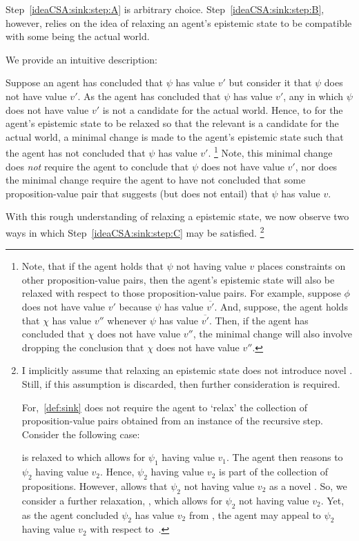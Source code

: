 \begin{note}
  Step~\ref{ideaCSA:sink:step:A} is arbitrary choice.
  Step~\ref{ideaCSA:sink:step:B}, however, relies on the idea of relaxing an agent's epistemic state to be compatible with some \epN{} \world{} being the actual world.

  We provide an intuitive description:

  Suppose an agent has concluded that \(\psi\) has value \(v'\) but consider it \ep{} that \(\psi\) does not have value \(v'\).
  As the agent has concluded that \(\psi\) has value \(v'\), any \ep{} in which \(\psi\) does not have value \(v'\) is not a candidate for the actual world.
  Hence, to for the agent's epistemic state to be relaxed so that the relevant \ep{} \world{} is a candidate for the actual world, a minimal change is made to the agent's epistemic state such that the agent has not concluded that \(\psi\) has value \(v'\).\nolinebreak
  \footnote{
    Note, that if the agent holds that \(\psi\) not having value \(v\) places constraints on other proposition-value pairs, then the agent's epistemic state will also be relaxed with respect to those proposition-value pairs.
    For example, suppose \(\phi\) does not have value \(v'\) because \(\psi\) has value \(\overline{v'}\).
    And, suppose, the agent holds that \(\chi\) has value \(v''\) whenever \(\psi\) has value \(\overline{v'}\).
    Then, if the agent has concluded that \(\chi\) does not have value \(v''\), the minimal change will also involve dropping the conclusion that \(\chi\) does not have value \(v''\).
  }
  Note, this minimal change does \emph{not} require the agent to conclude that \(\psi\) does not have value \(v'\), nor does the minimal change require the agent to have not concluded that some proposition-value pair that suggests (but does not entail) that \(\psi\) has value \(v\).

  With this rough understanding of relaxing a epistemic state, we now observe two ways in which Step~\ref{ideaCSA:sink:step:C} may be satisfied.\nolinebreak
  \footnote{
    I implicitly assume that relaxing an epistemic state does not introduce novel \epN{} .
    Still, if this assumption is discarded, then further consideration is required.

    For,~\autoref{def:sink} does not require the agent to `relax' the collection of proposition-value pairs obtained from an instance of the recursive step.
    Consider the following case:

    \eState{} is relaxed to  which allows for \(\psi_{1}\) having value \(v_{1}\).
    The agent then reasons to \(\psi_{2}\) having value \(v_{2}\).
    Hence, \(\psi_{2}\) having value \(v_{2}\) is part of the collection of propositions.
    However,  allows that \(\psi_{2}\) not having value \(v_{2}\) as a novel \epAdv{}.
    So, we consider a further relaxation, , which allows for \(\psi_{2}\) not having value \(v_{2}\).
    Yet, as the agent concluded \(\psi_{2}\) has value \(v_{2}\) from , the agent may appeal to \(\psi_{2}\) having value \(v_{2}\) with respect to~.

}
\end{note}
